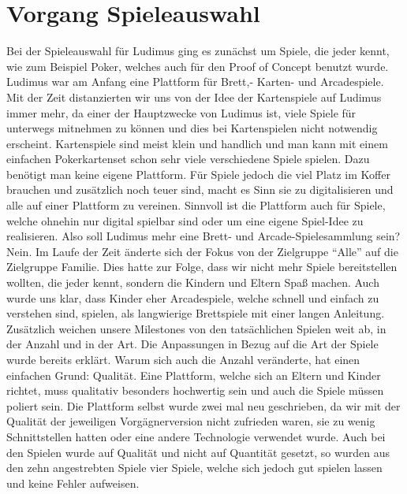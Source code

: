 \section{Vorgang Spieleauswahl}
Bei der Spieleauswahl für Ludimus ging es zunächst um Spiele, die jeder kennt, wie zum Beispiel Poker, welches auch für den Proof of Concept benutzt wurde. Ludimus war am Anfang eine Plattform für Brett,- Karten- und Arcadespiele. Mit der Zeit distanzierten wir uns von der Idee der Kartenspiele auf Ludimus immer mehr, da einer der Hauptzwecke von Ludimus ist, viele Spiele für unterwegs mitnehmen zu können und dies bei Kartenspielen nicht notwendig erscheint. Kartenspiele sind meist klein und handlich und man kann mit einem einfachen Pokerkartenset schon sehr viele verschiedene Spiele spielen. Dazu benötigt man keine eigene Plattform. Für Spiele jedoch die viel Platz im Koffer brauchen und zusätzlich noch teuer sind, macht es Sinn sie zu digitalisieren und alle auf einer Plattform zu vereinen. Sinnvoll ist die Plattform auch für Spiele, welche ohnehin nur digital spielbar sind oder um eine eigene Spiel-Idee zu realisieren. Also soll Ludimus mehr eine Brett- und Arcade-Spielesammlung sein? Nein. Im Laufe der Zeit änderte sich der Fokus von der Zielgruppe “Alle” auf die Zielgruppe Familie. Dies hatte zur Folge, dass wir nicht mehr Spiele bereitstellen wollten, die jeder kennt, sondern die Kindern und Eltern Spaß machen. Auch wurde uns klar, dass Kinder eher Arcadespiele, welche schnell und einfach zu verstehen sind, spielen, als langwierige Brettspiele mit einer langen Anleitung. Zusätzlich weichen unsere Milestones von den tatsächlichen Spielen weit ab, in der Anzahl und in der Art. Die Anpassungen in Bezug auf die Art der Spiele wurde bereits erklärt. Warum sich auch die Anzahl veränderte, hat einen einfachen Grund: Qualität. Eine Plattform, welche sich an Eltern und Kinder richtet, muss qualitativ besonders hochwertig sein und auch die Spiele müssen poliert sein. Die Plattform selbst wurde zwei mal neu geschrieben, da wir mit der Qualität der jeweiligen Vorgägnerversion nicht zufrieden waren, sie zu wenig Schnittstellen hatten oder eine andere Technologie verwendet wurde. Auch bei den Spielen wurde auf Qualität und nicht auf Quantität gesetzt, so wurden aus den zehn angestrebten Spiele vier Spiele, welche sich jedoch gut spielen lassen und keine Fehler aufweisen.
